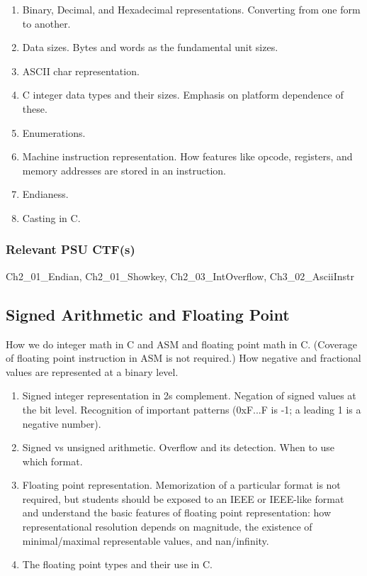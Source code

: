 \documentclass[12pt,letterpaper]{article}
\begin{document}
	\begin{enumerate}
		\item Binary, Decimal, and Hexadecimal representations. Converting from one form to another.
		\item Data sizes. Bytes and words as the fundamental unit sizes. 
		\item ASCII char representation.
		\item C integer data types and their sizes. Emphasis on platform dependence of these. 
		\item Enumerations.
		\item Machine instruction representation. How features like opcode, registers, and memory addresses are stored in an instruction.
		\item Endianess.
		\item Casting in C.
	\end{enumerate}

	\subsubsection*{Relevant PSU CTF(s)}

	Ch2\_01\_Endian, Ch2\_01\_Showkey, Ch2\_03\_IntOverflow, Ch3\_02\_AsciiInstr


	\subsection{Signed Arithmetic and Floating Point}

	How we do integer math in C and ASM and floating point math in C. (Coverage of floating point instruction in ASM is not required.) How negative and fractional values are represented at a binary level. 

	\begin{enumerate}
		\item Signed integer representation in 2s complement. Negation of signed values at the bit level. Recognition of important patterns (0xF...F is -1; a leading 1 is a negative number).
		\item Signed vs unsigned arithmetic. Overflow and its detection. When to use which format.
		\item Floating point representation. Memorization of a particular format is not required, but students should be exposed to an IEEE or IEEE-like format and understand the basic features of floating point representation: how representational resolution depends on magnitude, the existence of minimal/maximal representable values, and nan/infinity.
		\item The floating point types and their use in C. 
	\end{enumerate}
	
\end{document}
